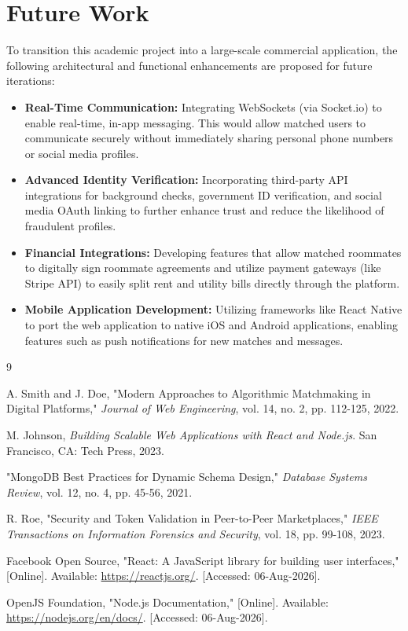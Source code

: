 \documentclass[12pt,a4paper]{report}
\begin{document}
\section{Future Work}
To transition this academic project into a large-scale commercial application, the following architectural and functional enhancements are proposed for future iterations:
\begin{itemize}
    \item \textbf{Real-Time Communication:} Integrating WebSockets (via Socket.io) to enable real-time, in-app messaging. This would allow matched users to communicate securely without immediately sharing personal phone numbers or social media profiles.
    \item \textbf{Advanced Identity Verification:} Incorporating third-party API integrations for background checks, government ID verification, and social media OAuth linking to further enhance trust and reduce the likelihood of fraudulent profiles.
    \item \textbf{Financial Integrations:} Developing features that allow matched roommates to digitally sign roommate agreements and utilize payment gateways (like Stripe API) to easily split rent and utility bills directly through the platform.
    \item \textbf{Mobile Application Development:} Utilizing frameworks like React Native to port the web application to native iOS and Android applications, enabling features such as push notifications for new matches and messages.
\end{itemize}

\renewcommand{\bibname}{References}
\begin{thebibliography}{9}

A. Smith and J. Doe, "Modern Approaches to Algorithmic Matchmaking in Digital Platforms," \textit{Journal of Web Engineering}, vol. 14, no. 2, pp. 112-125, 2022.

M. Johnson, \textit{Building Scalable Web Applications with React and Node.js}. San Francisco, CA: Tech Press, 2023.

"MongoDB Best Practices for Dynamic Schema Design," \textit{Database Systems Review}, vol. 12, no. 4, pp. 45-56, 2021.

R. Roe, "Security and Token Validation in Peer-to-Peer Marketplaces," \textit{IEEE Transactions on Information Forensics and Security}, vol. 18, pp. 99-108, 2023.

Facebook Open Source, "React: A JavaScript library for building user interfaces," [Online]. Available: \url{https://reactjs.org/}. [Accessed: 06-Aug-2026].

OpenJS Foundation, "Node.js Documentation," [Online]. Available: \url{https://nodejs.org/en/docs/}. [Accessed: 06-Aug-2026].

\end{thebibliography}
\end{document}
